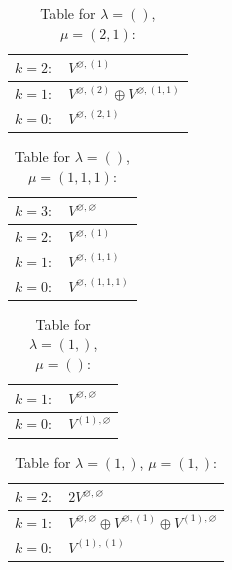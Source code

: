 \renewcommand{\arraystretch}{1.6} 
\begin{table}[H]
\centering
\caption{Table for $\lambda = ()$, $\mu = (2, 1)$:}
\begin{tabular}{|>{\centering\arraybackslash}p{15cm}|}
\hline
 $k = 2: \quad V^{\varnothing, (1)} $ \\ \hline
 $k = 1: \quad V^{\varnothing, (2)} \oplus V^{\varnothing, (1, 1)} $ \\ \hline
 $k = 0: \quad V^{\varnothing, (2, 1)} $ \\ \hline
\end{tabular}
\end{table}

\renewcommand{\arraystretch}{1.6} 
\begin{table}[H]
\centering
\caption{Table for $\lambda = ()$, $\mu = (1, 1, 1)$:}
\begin{tabular}{|>{\centering\arraybackslash}p{15cm}|}
\hline
 $k = 3: \quad V^{\varnothing, \varnothing} $ \\ \hline
 $k = 2: \quad V^{\varnothing, (1)} $ \\ \hline
 $k = 1: \quad V^{\varnothing, (1, 1)} $ \\ \hline
 $k = 0: \quad V^{\varnothing, (1, 1, 1)} $ \\ \hline
\end{tabular}
\end{table}

\renewcommand{\arraystretch}{1.6} 
\begin{table}[H]
\centering
\caption{Table for $\lambda = (1,)$, $\mu = ()$:}
\begin{tabular}{|>{\centering\arraybackslash}p{15cm}|}
\hline
 $k = 1: \quad V^{\varnothing, \varnothing} $ \\ \hline
 $k = 0: \quad V^{(1), \varnothing} $ \\ \hline
\end{tabular}
\end{table}

\renewcommand{\arraystretch}{1.6} 
\begin{table}[H]
\centering
\caption{Table for $\lambda = (1,)$, $\mu = (1,)$:}
\begin{tabular}{|>{\centering\arraybackslash}p{15cm}|}
\hline
 $k = 2: \quad 2 V^{\varnothing, \varnothing} $ \\ \hline
 $k = 1: \quad V^{\varnothing, \varnothing} \oplus V^{\varnothing, (1)} \oplus V^{(1), \varnothing} $ \\ \hline
 $k = 0: \quad V^{(1), (1)} $ \\ \hline
\end{tabular}
\end{table}


